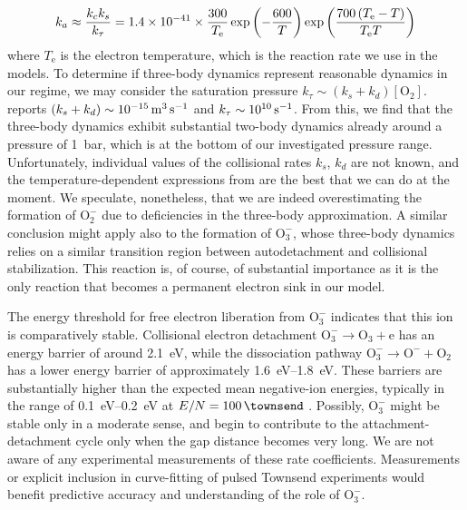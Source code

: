 \documentclass{iopjournal}
\newcommand{\e}{\ensuremath{\text{e}}}
\providecommand\Otwo{\ensuremath{\textrm{O}_2}}
\providecommand\Otwom{\ensuremath{\textrm{O}_2^-}}
\providecommand\Othree{\ensuremath{\textrm{O}_3}}
\providecommand\Othreem{\ensuremath{\textrm{O}_3^-}}
\providecommand\Ominus{\ensuremath{\textrm{O}^-}}
\begin{document}
\begin{equation}
  \label{eq:three_body_rate}
  k_a\approx \frac{k_c k_s}{k_\tau} = \num{1.4E-41}\times\frac{300}{T_\e}\exp\left(-\frac{600}{T}\right)\exp\left(\frac{700\left(T_\e - T\right)}{T_\e T}\right)
\end{equation}
where $T_\e$ is the electron temperature, which is the reaction rate we use in the models.
To determine if three-body dynamics represent reasonable dynamics in our regime, we may consider the saturation pressure $k_\tau \sim  \left(k_s + k_d\right)\left[\Otwo\right]$.
\textcite{Aleksandrov1988} reports $\left(k_s + k_d\right) \sim \SI{E-15}{\cubic\meter\per\second}$ and $k_\tau\sim\SI{E10}{\per\second}$.
From this, we find that the three-body dynamics exhibit substantial two-body dynamics already around a pressure of \SI{1}{\bar}, which is at the bottom of our investigated pressure range.
Unfortunately, individual values of the collisional rates $k_s$, $k_d$ are not known, and the temperature-dependent expressions from \textcite{Kossyi1992} are the best that we can do at the moment.
We speculate, nonetheless, that we are indeed overestimating the formation of $\Otwom$ due to deficiencies in the three-body approximation.
A similar conclusion might apply also to the formation of $\Othreem$, whose three-body dynamics relies on a similar transition region between autodetachment and collisional stabilization.
This reaction is, of course, of substantial importance as it is the only reaction that becomes a permanent electron sink in our model.

The energy threshold for free electron liberation from $\Othreem$ indicates that this ion is comparatively stable.
Collisional electron detachment $\Othreem \rightarrow \Othree + \e$ has an energy barrier of around \SI{2.1}{\electronvolt}, while the dissociation pathway $\Othreem \rightarrow \Ominus + \Otwo$ has a lower energy barrier of approximately \SIrange{1.6}{1.8}{\electronvolt}.
These barriers are substantially higher than the expected mean negative-ion energies, typically in the range of \SIrange{0.1}{0.2}{\electronvolt} at $E/N = \SI{100}{\townsend}$ \cite{Pancheshnyi2013}.
Possibly, $\Othreem$ might be stable only in a moderate sense, and begin to contribute to the attachment-detachment cycle only when the gap distance becomes very long.
We are not aware of any experimental measurements of these rate coefficients.
Measurements or explicit inclusion in curve-fitting of pulsed Townsend experiments \cite{Hsl2017} would benefit predictive accuracy and understanding of the role of $\Othreem$.
\end{document}
